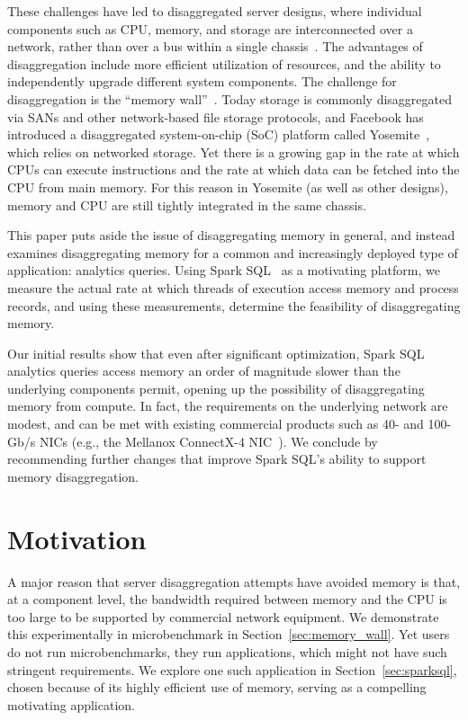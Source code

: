 \documentclass{sig-alternate-05-2015}
\begin{document}
These challenges have led to disaggregated server designs, where individual
components such as CPU, memory, and storage are interconnected over a network,
rather than over a bus within a single
chassis~\cite{Han:2013:NSR:2535771.2535778}.  The advantages of disaggregation
include more efficient utilization of resources, and the ability to
independently upgrade different system components.  The challenge for
disaggregation is the ``memory wall''~\cite{Wulf:1995:HMW:216585.216588}. Today
storage is commonly disaggregated via SANs and other network-based file storage
protocols, and Facebook has introduced a disaggregated system-\-on-\-chip (SoC)
platform called Yosemite~\cite{fb-yosemite}, which relies on networked storage.
Yet there is a growing gap in the rate at which CPUs can execute instructions
and the rate at which data can be fetched into the CPU from main memory.  For
this reason in Yosemite (as well as other designs), memory and CPU are still
tightly integrated in the same chassis.

This paper puts aside the issue of disaggregating memory in general, and
instead examines disaggregating memory for a common and increasingly deployed
type of application: analytics queries. Using Spark
SQL~\cite{Armbrust:2015:SSR:2723372.2742797} as a motivating platform, we
measure the actual rate at which threads of execution access memory and process
records, and using these measurements, determine the feasibility of
disaggregating memory.

Our initial results show that even after significant optimization, Spark SQL
analytics queries access memory an order of magnitude slower than the
underlying components permit, opening up the possibility of disaggregating
memory from compute.  In fact, the requirements on the underlying network are
modest, and can be met with existing commercial products such as 40- and
100-Gb/s NICs (e.g., the Mellanox ConnectX-4 NIC~\cite{mellanox100g}).  We
conclude by recommending further changes that improve Spark SQL's ability to
support memory disaggregation.

\section{Motivation}

A major reason that server disaggregation attempts have avoided memory is that,
at a component level, the bandwidth required between memory and the CPU is too
large to be supported by commercial network equipment. We demonstrate this
experimentally in microbenchmark in Section~\ref{sec:memory_wall}.  Yet users
do not run microbenchmarks, they run applications, which might not have such
stringent requirements.  We explore one such application in
Section~\ref{sec:sparksql}, chosen because of its highly efficient use of
memory, serving as a compelling motivating application.
\end{document}
